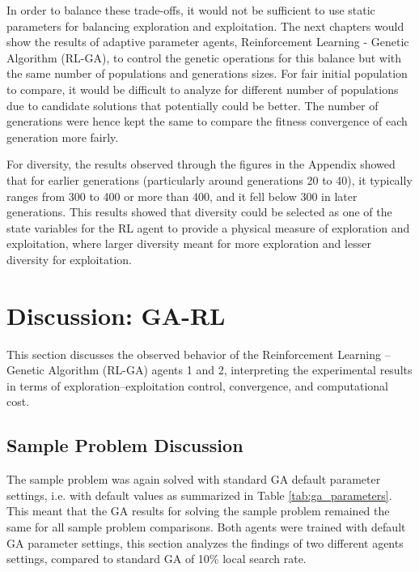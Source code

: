 \documentclass{article}
\begin{document}
In order to balance these trade-offs, it would not be sufficient to use static parameters for balancing exploration and exploitation. The next chapters would show the results of adaptive parameter agents, Reinforcement Learning - Genetic Algorithm (RL-GA), to control the genetic operations for this balance but with the same number of populations and generations sizes. For fair initial population to compare, it would be difficult to analyze for different number of populations due to candidate solutions that potentially could be better. The number of generations were hence kept the same to compare the fitness convergence of each generation more fairly.

For diversity, the results observed through the figures in the Appendix showed that for earlier generations (particularly around generations 20 to 40), it typically ranges from 300 to 400 or more than 400, and it fell below 300 in later generations. This results showed that diversity could be selected as one of the state variables for the RL agent to provide a physical measure of exploration and exploitation, where larger diversity meant for more exploration and lesser diversity for exploitation.

\newpage
\section{Discussion: GA-RL}

This section discusses the observed behavior of the Reinforcement Learning -- Genetic Algorithm (RL-GA) agents 1 and 2, interpreting the experimental results in terms of exploration--exploitation control, convergence, and computational cost.

\subsection{Sample Problem Discussion}
The sample problem was again solved with standard GA default parameter settings, i.e. with default values as summarized in Table \ref{tab:ga_parameters}. This meant that the GA results for solving the sample problem remained the same for all sample problem comparisons. Both agents were trained with default GA parameter settings, this section analyzes the findings of two different agents settings, compared to standard GA of 10\% local search rate.
\end{document}
